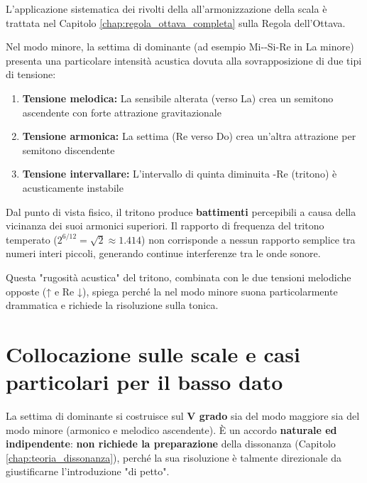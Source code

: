 L'applicazione sistematica dei rivolti della  all'armonizzazione della scala è trattata nel Capitolo \ref{chap:regola_ottava_completa} sulla Regola dell'Ottava.

\begin{fisica}
	Nel modo minore, la settima di dominante (ad esempio Mi-\Soldiesis -Si-Re in La minore) presenta una particolare intensità acustica dovuta alla sovrapposizione di due tipi di tensione:
	
	\begin{enumerate}
		\item \textbf{Tensione melodica:} La sensibile alterata (\Soldiesis  verso La) crea un semitono ascendente con forte attrazione gravitazionale
		\item \textbf{Tensione armonica:} La settima (Re verso Do) crea un'altra attrazione per semitono discendente
		\item \textbf{Tensione intervallare:} L'intervallo di quinta diminuita \Soldiesis -Re (tritono) è acusticamente instabile
	\end{enumerate}
	
	Dal punto di vista fisico, il tritono produce \textbf{battimenti} percepibili a causa della vicinanza dei suoi armonici superiori. Il rapporto di frequenza del tritono temperato ($2^{6/12} = \sqrt{2} \approx 1.414$) non corrisponde a nessun rapporto semplice tra numeri interi piccoli, generando continue interferenze tra le onde sonore.
	
	Questa "rugosità acustica" del tritono, combinata con le due tensioni melodiche opposte (\Soldiesis  ↑ e Re ↓), spiega perché la  nel modo minore suona particolarmente drammatica e richiede la risoluzione sulla tonica.
\end{fisica}

\section{Collocazione sulle scale e casi particolari per il basso dato}
\label{sec:v7_basso_dato}

\begin{regola}
	\label{reg:collocazione_v7}
	La settima di dominante si costruisce sul \textbf{V grado} sia del modo maggiore sia del modo minore (armonico e melodico ascendente). È un accordo \textbf{naturale ed indipendente}: \textbf{non richiede la preparazione} della dissonanza (Capitolo \ref{chap:teoria_dissonanza}), perché la sua risoluzione è talmente direzionale da giustificarne l'introduzione "di petto".
\end{regola}

